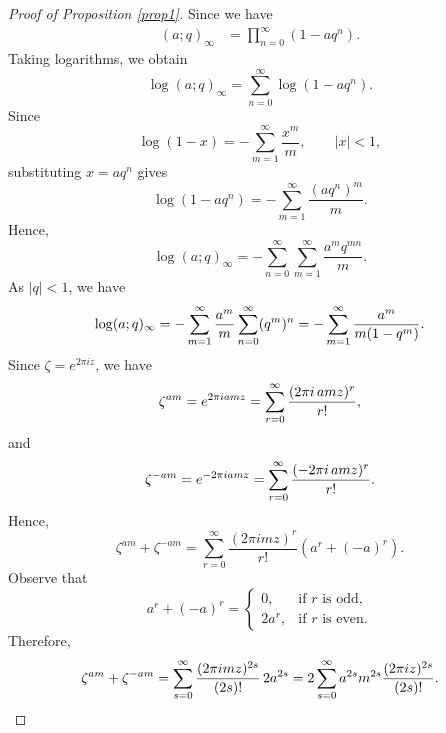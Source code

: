 \documentclass[10pt,a4paper]{amsart}
\begin{document}
\begin{proof}[Proof of Proposition \ref{prop1}]
	Since we have
	\begin{align*}
		(a;q)_\infty
		&=
		\prod_{n=0}^{\infty}(1-aq^n).
	\end{align*}
	Taking logarithms, we obtain
	\begin{equation}\label{p1}
		\log (a;q)_\infty
		=
		\sum_{n=0}^{\infty}\log(1-aq^n).
	\end{equation}
	Since
	\begin{equation}\label{p2}
		\log(1-x)
		=
		-\sum_{m=1}^{\infty}\frac{x^m}{m},
		\qquad |x|<1,
	\end{equation}
	substituting $x=aq^n$ gives
	\begin{equation}\label{p3}
		\log(1-aq^n)
		=
		-\sum_{m=1}^{\infty}\frac{(aq^n)^m}{m}.
	\end{equation}
	Hence,
	\begin{equation}\label{p4}
		\log(a;q)_\infty
		=
		-\sum_{n=0}^{\infty}\sum_{m=1}^{\infty}
		\frac{a^m q^{mn}}{m}.
	\end{equation}
	As $|q|<1$, we have
	\begin{equation}\label{p5}
		\log(a;q)_\infty
		=
		-\sum_{m=1}^{\infty}\frac{a^m}{m}
		\sum_{n=0}^{\infty}(q^m)^n \\
		=
		-\sum_{m=1}^{\infty}
		\frac{a^m}{m(1-q^m)}.
	\end{equation}
	Since $\zeta=e^{2\pi iz}$, we have
	\begin{equation}\label{p6}
		\zeta^{am}
		=e^{2\pi iamz}\\
		=\sum_{r=0}^{\infty}
		\frac{(2\pi i\,amz)^r}{r!},
	\end{equation}
	and
	\begin{equation}\label{p7}
		\zeta^{-am}
		=e^{-2\pi iamz}\\
		=\sum_{r=0}^{\infty}
		\frac{(-2\pi i\,amz)^r}{r!}.
	\end{equation}
	Hence,
	\begin{equation}\label{p8}
		\zeta^{am}+\zeta^{-am}
		=
		\sum_{r=0}^{\infty}
		\frac{(2\pi i mz)^r}{r!}
		\left(a^r+(-a)^r\right).
	\end{equation}
	Observe that
	\[
	a^r+(-a)^r=
	\begin{cases}
		0, & \text{if } r \text{ is odd},\\[2mm]
		2a^r, & \text{if } r \text{ is even}.
	\end{cases}
	\]
	Therefore,
	\begin{equation}
		\zeta^{am}+\zeta^{-am}
		=
		\sum_{s=0}^{\infty}
		\frac{(2\pi i mz)^{2s}}{(2s)!}\,2a^{2s}\\
		=
		2\sum_{s=0}^{\infty}
		a^{2s}m^{2s}
		\frac{(2\pi iz)^{2s}}{(2s)!}.
		\label{eq:9}
	\end{equation} 
\end{proof}
\end{document}
